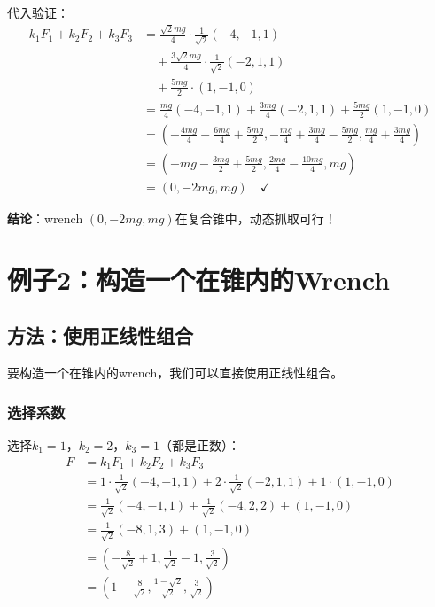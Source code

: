 \documentclass[12pt,a4paper]{article}
\begin{document}
代入验证：
\begin{align}
k_1 F_1 + k_2 F_2 + k_3 F_3 &= \frac{\sqrt{2}mg}{4} \cdot \frac{1}{\sqrt{2}}(-4, -1, 1) \\
&\quad + \frac{3\sqrt{2}mg}{4} \cdot \frac{1}{\sqrt{2}}(-2, 1, 1) \\
&\quad + \frac{5mg}{2} \cdot (1, -1, 0) \\
&= \frac{mg}{4}(-4, -1, 1) + \frac{3mg}{4}(-2, 1, 1) + \frac{5mg}{2}(1, -1, 0) \\
&= \left(-\frac{4mg}{4} - \frac{6mg}{4} + \frac{5mg}{2}, -\frac{mg}{4} + \frac{3mg}{4} - \frac{5mg}{2}, \frac{mg}{4} + \frac{3mg}{4}\right) \\
&= \left(-mg - \frac{3mg}{2} + \frac{5mg}{2}, \frac{2mg}{4} - \frac{10mg}{4}, mg\right) \\
&= \left(0, -2mg, mg\right) \quad \checkmark
\end{align}

\textbf{结论}：wrench $(0, -2mg, mg)$在复合锥中，动态抓取可行！

\section{例子2：构造一个在锥内的Wrench}

\subsection{方法：使用正线性组合}

要构造一个在锥内的wrench，我们可以直接使用正线性组合。

\subsubsection{选择系数}

选择$k_1 = 1$，$k_2 = 2$，$k_3 = 1$（都是正数）：
\begin{align}
F &= k_1 F_1 + k_2 F_2 + k_3 F_3 \\
&= 1 \cdot \frac{1}{\sqrt{2}}(-4, -1, 1) + 2 \cdot \frac{1}{\sqrt{2}}(-2, 1, 1) + 1 \cdot (1, -1, 0) \\
&= \frac{1}{\sqrt{2}}(-4, -1, 1) + \frac{1}{\sqrt{2}}(-4, 2, 2) + (1, -1, 0) \\
&= \frac{1}{\sqrt{2}}(-8, 1, 3) + (1, -1, 0) \\
&= \left(-\frac{8}{\sqrt{2}} + 1, \frac{1}{\sqrt{2}} - 1, \frac{3}{\sqrt{2}}\right) \\
&= \left(1 - \frac{8}{\sqrt{2}}, \frac{1 - \sqrt{2}}{\sqrt{2}}, \frac{3}{\sqrt{2}}\right)
\end{align}
\end{document}
